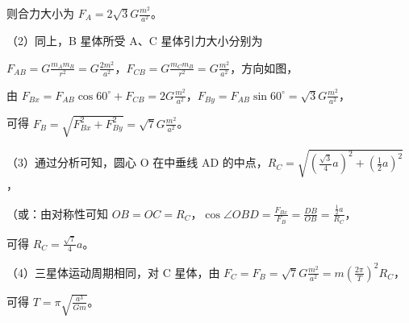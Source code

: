 \documentclass[\gkver]{gaokaozhenti}
\begin{document}
\begin{enumerate}
{	则合力大小为 $F_{A}=2\sqrt{3}G\frac{m^{2}}{a^{2}}$。

	（2）同上，B 星体所受 A、C 星体引力大小分别为

	$F_{AB}=G\frac{m_{A}m_{B}}{r^{2}}=G\frac{2m^{2}}{a^{2}}$，$F_{CB}=G\frac{m_{C}m_{B}}{r^{2}}=G\frac{m^{2}}{a^{2}}$，方向如图，

	由 $F_{Bx}=F_{AB}\cos60^{\circ}+F_{CB}=2G\frac{m^{2}}{a^{2}}$，$F_{By}=F_{AB}\sin60^{\circ}=\sqrt{3}G\frac{m^{2}}{a^{2}}$，

	可得 $F_{B}=\sqrt{F_{Bx}^{2}+F_{By}^{2}}=\sqrt{7}G\frac{m^{2}}{a^{2}}$。

	（3）通过分析可知，圆心 O 在中垂线 AD 的中点，$R_{C}=\sqrt{\left(\frac{\sqrt{3}}{4}a\right)^{2}+\left(\frac{1}{2}a\right)^{2}}$，

	（或：由对称性可知 $OB=OC=R_{C}$，$\cos\angle OBD=\frac{F_{Bx}}{F_{B}}=\frac{DB}{OB}=\frac{\frac{1}{2}a}{R_{C}}$，

	可得 $R_{C}=\frac{\sqrt{7}}{4}a$。

	（4）三星体运动周期相同，对 C 星体，由 $F_{C}=F_{B}=\sqrt{7}G\frac{m^{2}}{a^{2}}=m\left(\frac{2\pi}{T}\right)^{2}R_{C}$，

	可得 $T=\pi\sqrt{\frac{a^{3}}{Gm}}$。

}

\end{enumerate}
\end{document}
